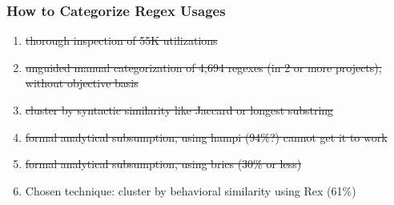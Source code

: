 \begin{frame}
\frametitle{How to Categorize Regex Usages}
\begin{enumerate}
\item \sout{thorough inspection of 55K utilizations}
\item \sout{unguided manual categorization of 4,694 regexes (in 2 or more projects), without objective basis}
\item \sout{cluster by syntactic similarity like Jaccard or longest substring}
\item \sout{formal analytical subsumption, using hampi (94\%?) cannot get it to work}
\item \sout{formal analytical subsumption, using brics (30\% or less)}
\item Chosen technique: cluster by behavioral similarity using Rex (61\%)
\end{enumerate}
\end{frame}


